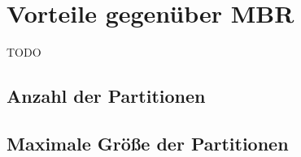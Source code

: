 \section{Vorteile gegenüber MBR}
TODO

\subsection{Anzahl der Partitionen}

\subsection{Maximale Größe der Partitionen}
